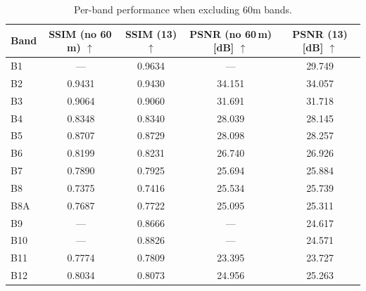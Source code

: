 \begin{table}[!htbp]
    \centering
    \setlength{\tabcolsep}{6pt}
    \renewcommand{\arraystretch}{1.15}
    \caption[Per-band performance when excluding 60m bands]{Per-band performance when excluding 60m bands.}
    \label{tab:ablation_excluding_60m_per_band}
    \begin{tabular}{lcccc}
    \hline
    \textbf{Band} & \textbf{SSIM (no 60\,m)} $\uparrow$ & \textbf{SSIM (13)} $\uparrow$ & \textbf{PSNR (no 60\,m) [dB]} $\uparrow$ & \textbf{PSNR (13) [dB]} $\uparrow$ \\
    \hline
    B1   & ---    & 0.9634 & ---    & 29.749 \\
    B2   & 0.9431 & 0.9430 & 34.151 & 34.057 \\
    B3   & 0.9064 & 0.9060 & 31.691 & 31.718 \\
    B4   & 0.8348 & 0.8340 & 28.039 & 28.145 \\
    B5   & 0.8707 & 0.8729 & 28.098 & 28.257 \\
    B6   & 0.8199 & 0.8231 & 26.740 & 26.926 \\
    B7   & 0.7890 & 0.7925 & 25.694 & 25.884 \\
    B8   & 0.7375 & 0.7416 & 25.534 & 25.739 \\
    B8A  & 0.7687 & 0.7722 & 25.095 & 25.311 \\
    B9   & ---    & 0.8666 & ---    & 24.617 \\
    B10  & ---    & 0.8826 & ---    & 24.571 \\
    B11  & 0.7774 & 0.7809 & 23.395 & 23.727 \\
    B12  & 0.8034 & 0.8073 & 24.956 & 25.263 \\
    \hline
    \end{tabular}
\end{table}
